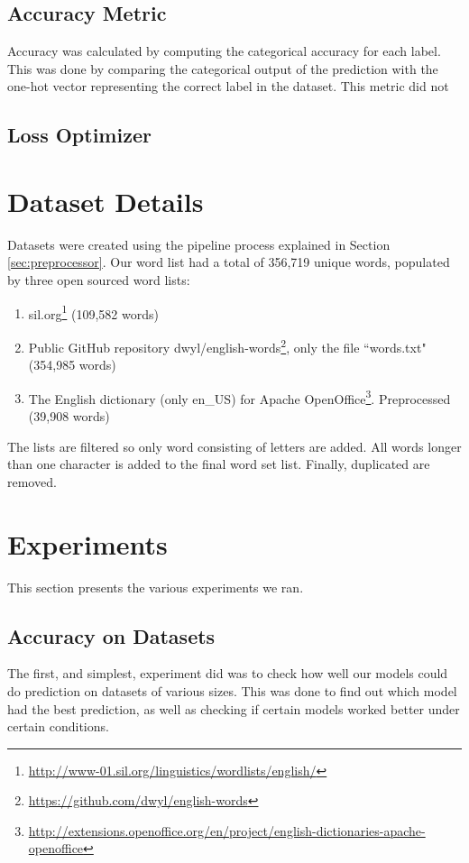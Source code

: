 \subsection{Accuracy Metric}
Accuracy was calculated by computing the categorical accuracy for each label. This was done by comparing the categorical output of the prediction with the one-hot vector representing the correct label in the dataset. This metric did not

\subsection{Loss Optimizer}


\section{Dataset Details}
Datasets were created using the pipeline process explained in Section \ref{sec:preprocessor}. Our word list had a total of 356,719 unique words, populated by three open sourced word lists:

\begin{enumerate}
    \item sil.org\footnote{\url{http://www-01.sil.org/linguistics/wordlists/english/}} (109,582 words)
    \item Public GitHub repository dwyl/english-words\footnote{\url{https://github.com/dwyl/english-words}}, only the file ``words.txt" (354,985 words) 
    \item The English dictionary (only en\_US) for Apache OpenOffice\footnote{\url{http://extensions.openoffice.org/en/project/english-dictionaries-apache-openoffice}}. Preprocessed (39,908 words)
\end{enumerate}

The lists are filtered so only word consisting of letters are added. All words longer than one character is added to the final word set list. Finally, duplicated are removed.


\section{Experiments}
This section presents the various experiments we ran.

\subsection{Accuracy on Datasets}
\label{sec:accuracy_on_datasets}
The first, and simplest, experiment did was to check how well our models could do prediction on datasets of various sizes. This was done to find out which model had the best prediction, as well as checking if certain models worked better under certain conditions.


